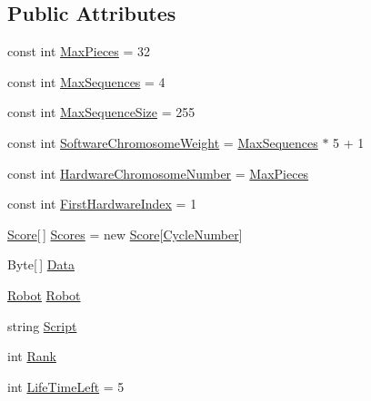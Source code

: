 \subsection*{Public Attributes}
\begin{DoxyCompactItemize}
\item 
const int \hyperlink{classgearit_1_1src_1_1_genetic_algorithm_1_1_genome_1_1_raw_dna_a5c9824e0482851a18a5ef758c4b5b794}{Max\+Pieces} = 32
\item 
const int \hyperlink{classgearit_1_1src_1_1_genetic_algorithm_1_1_genome_1_1_raw_dna_a31881cc6cea0521eece9fc41bc149ae3}{Max\+Sequences} = 4
\item 
const int \hyperlink{classgearit_1_1src_1_1_genetic_algorithm_1_1_genome_1_1_raw_dna_a5e7d29cfdd2c69c8340b7238cf611cd6}{Max\+Sequence\+Size} = 255
\item 
const int \hyperlink{classgearit_1_1src_1_1_genetic_algorithm_1_1_genome_1_1_raw_dna_af93190d28d1730de188a9d0cebbb20cc}{Software\+Chromosome\+Weight} = \hyperlink{classgearit_1_1src_1_1_genetic_algorithm_1_1_genome_1_1_raw_dna_a31881cc6cea0521eece9fc41bc149ae3}{Max\+Sequences} $\ast$ 5 + 1
\item 
const int \hyperlink{classgearit_1_1src_1_1_genetic_algorithm_1_1_genome_1_1_raw_dna_a723a4b70da44b25c155f2756e917a776}{Hardware\+Chromosome\+Number} = \hyperlink{classgearit_1_1src_1_1_genetic_algorithm_1_1_genome_1_1_raw_dna_a5c9824e0482851a18a5ef758c4b5b794}{Max\+Pieces}
\item 
const int \hyperlink{classgearit_1_1src_1_1_genetic_algorithm_1_1_genome_1_1_raw_dna_a8b0396a23e7499b70c03c23429132e38}{First\+Hardware\+Index} = 1
\item 
\hyperlink{classgearit_1_1src_1_1game_1_1_score}{Score}\mbox{[}$\,$\mbox{]} \hyperlink{classgearit_1_1src_1_1_genetic_algorithm_1_1_genome_1_1_raw_dna_a27ec75b7f548c45537ed34cb4bac7128}{Scores} = new \hyperlink{classgearit_1_1src_1_1game_1_1_score}{Score}\mbox{[}\hyperlink{classgearit_1_1src_1_1_genetic_algorithm_1_1_genome_1_1_raw_dna_a805951c3b52ce03b5b4206cd0d1bc935}{Cycle\+Number}\mbox{]}
\item 
Byte\mbox{[}$\,$\mbox{]} \hyperlink{classgearit_1_1src_1_1_genetic_algorithm_1_1_genome_1_1_raw_dna_aa01c0c63ae90482089b652162bb92aef}{Data}
\item 
\hyperlink{classgearit_1_1src_1_1robot_1_1_robot}{Robot} \hyperlink{classgearit_1_1src_1_1_genetic_algorithm_1_1_genome_1_1_raw_dna_a1e1796bd5b235f0ca55bc5600b023091}{Robot}
\item 
string \hyperlink{classgearit_1_1src_1_1_genetic_algorithm_1_1_genome_1_1_raw_dna_a4d69428321bbb376ac63d52653045172}{Script}
\item 
int \hyperlink{classgearit_1_1src_1_1_genetic_algorithm_1_1_genome_1_1_raw_dna_abd2e1995bb19fca0ede7aa3e9ecac17c}{Rank}
\item 
int \hyperlink{classgearit_1_1src_1_1_genetic_algorithm_1_1_genome_1_1_raw_dna_a6143f54990e5ad300313282331212185}{Life\+Time\+Left} = 5
\end{DoxyCompactItemize}
